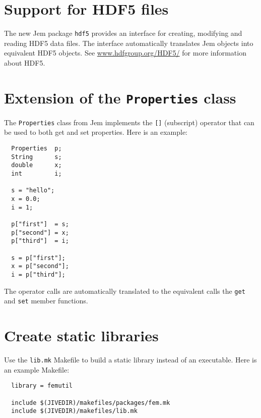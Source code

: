 \documentclass[a4paper]{article}
\newcommand{\Code}[1]{\texttt{#1}}
\begin{document}

\section{Support for HDF5 files}

The new Jem package \Code{hdf5} provides an interface for creating,
modifying and reading HDF5 data files. The interface automatically
translates Jem objects into equivalent HDF5 objects. See
\url{www.hdfgroup.org/HDF5/} for more information about HDF5.


\section{Extension of the \Code{Properties} class}

The \Code{Properties} class from Jem implements the \Code{[]} (subscript)
operator that can be used to both get and set properties. Here is an
example:

\begin{lstlisting}
  Properties  p;
  String      s;
  double      x;
  int         i;

  s = "hello";
  x = 0.0;
  i = 1;

  p["first"]  = s;
  p["second"] = x;
  p["third"]  = i;

  s = p["first"];
  x = p["second"];
  i = p["third"];
\end{lstlisting}

The operator calls are automatically translated to the equivalent calls
the \Code{get} and \Code{set} member functions.


\section{Create static libraries}

Use the \Code{lib.mk} Makefile to build a static library instead of an
executable. Here is an example Makefile:

\begin{lstlisting}
  library = femutil

  include $(JIVEDIR)/makefiles/packages/fem.mk
  include $(JIVEDIR)/makefiles/lib.mk
\end{lstlisting}
\end{document}
